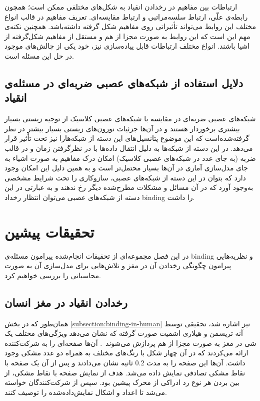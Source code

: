 \documentclass[12pt]{report}
\begin{document}
	ارتباطات بین مفاهیم در رخدادن انقیاد به شکل‌های مختلفی ممکن است؛ همچون رابطه‌ی علّی، ارتباط سلسه‌مراتبی و ارتباط مقایسه‌ای. تعریف مفاهیم در قالب انواع مختلف این روابط می‌تواند تأثیراتی روی مفاهیم شکل گرفته داشته‌باشد. همچنین نکته‌ی مهم‌ این است که این روابط به صورت مجزا از هم و مستقل از مفاهیم شکل‌گرفته‌ از اشیا باشند. انواع مختلف ارتباطات قابل پیاده‌سازی نیز، خود یکی از چالش‌های موجود در حل این مسئله است.
	
	\section{دلایل استفاده از شبکه‌های عصبی ضربه‌ای در مسئله‌ی انقیاد}
	شبکه‌های عصبی ضربه‌ای در مقایسه با شبکه‌های عصبی کلاسیک از توجیه زیستی بسیار بیشتری برخوردار هستند و در آن‌ها جزئیات نورون‌های زیستی بسیار بیشتر در نظر گرفته‌شده‌است که این موضوع پتانسیل‌های این دسته از شبکه‌هارا نیز تحت تأثیر قرار می‌دهد. در این دسته از شبکه‌ها به دلیل انتقال داده‌ها با در نظر‌گرفتن زمان و در قالب ضربه (به جای عدد در شبکه‌‌های عصبی کلاسیک) امکان درک مفاهیم به صورت اشیاء به جای مدل‌سازی آماری در آن‌ها بسیار محتمل‌تر است و به همین دلیل این امکان وجود دارد که بتوان در این دسته از شبکه‌های عصبی، سازوکاری را تحت شرایط مشخصی به‌وجود آورد که در آن مسائل و مشکلات مطرح‌شده دیگر رخ ندهند و به عبارتی در این دسته از شبکه‌های عصبی می‌توان انتظار رخداد \gls{binding} را داشت.
	
	\chapter{تحقیقات پیشین}
	
	در این فصل مجموعه‌ای از تحقیقات انجام‌شده پیرامون مسئله‌ی \gls{binding} و نظریه‌هایی پیرامون چگونگی رخدادن آن در مغز و تلاش‌هایی برای مدل‌سازی آن به صورت محاسباتی را بررسی خواهیم کرد.
	
	\section{رخدادن انقیاد در مغز انسان}
	همان‌طور که در بخش \ref{subsection:binding-in-human} نیز اشاره شد، تحقیقی توسط آنه تریسمن و هیلاری اشمیت صورت گرفته که نشان می‌دهد ویژگی‌های مختلف یک شی در مغز به صورت مجزا از هم پردازش می‌شوند~\cite{TREISMAN1982107}.
	آن‌ها صفحه‌ای را به شرکت‌کننده ارائه می‌کردند که در آن چهار شکل با رنگ‌های مختلف به همراه دو عدد مشکی وجود داشت. آن‌ها این صفحه را به مدت $0.2$ ثانیه نشان می‌دادند و پس از آن یک صفحه با نقاط مشکی تصادفی نمایش داده می‌شد. هدف از نمایش صفحه با نقاط مشکی، از بین بردن هر نوع رد ادراکی از محرک پیشین بود. سپس از شرکت‌کنندگان خواسته می‌شد تا اعداد و اشکال نمایش‌داده‌شده را توصیف کنند.
	
\end{document}
